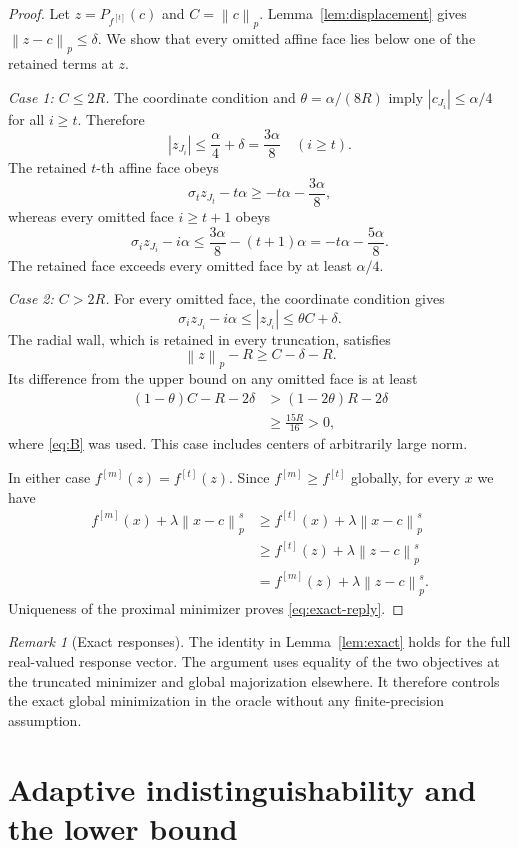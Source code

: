 \documentclass[11pt]{article}
\theoremstyle{definition}
\theoremstyle{remark}
\newtheorem{remark}[theorem]{Remark}
\newcommand{\norm}[1]{\left\lVert#1\right\rVert}
\begin{document}
\begin{proof}
Let $z=P_{f^{[t]}}(c)$ and $C=\norm{c}_p$. Lemma~\ref{lem:displacement}
gives $\norm{z-c}_p\le\delta$. We show that every omitted affine face lies
below one of the retained terms at $z$.

\emph{Case 1: $C\le2R$.}
The coordinate condition and $\theta=\alpha/(8R)$ imply
$|c_{J_i}|\le\alpha/4$ for all $i\ge t$. Therefore
\[
|z_{J_i}|\le\frac{\alpha}{4}+\delta=\frac{3\alpha}{8}
\quad(i\ge t).
\]
The retained $t$-th affine face obeys
\[
\sigma_tz_{J_t}-t\alpha\ge-t\alpha-\frac{3\alpha}{8},
\]
whereas every omitted face $i\ge t+1$ obeys
\[
\sigma_i z_{J_i}-i\alpha
\le\frac{3\alpha}{8}-(t+1)\alpha
=-t\alpha-\frac{5\alpha}{8}.
\]
The retained face exceeds every omitted face by at least $\alpha/4$.

\emph{Case 2: $C>2R$.}
For every omitted face, the coordinate condition gives
\[
\sigma_i z_{J_i}-i\alpha\le|z_{J_i}|\le\theta C+\delta.
\]
The radial wall, which is retained in every truncation, satisfies
\[
\norm{z}_p-R\ge C-\delta-R.
\]
Its difference from the upper bound on any omitted face is at least
\begin{align*}
(1-\theta)C-R-2\delta
&>(1-2\theta)R-2\delta\\
&\ge\frac{15R}{16}>0,
\end{align*}
where \eqref{eq:B} was used. This case includes centers of arbitrarily
large norm.

In either case $f^{[m]}(z)=f^{[t]}(z)$. Since $f^{[m]}\ge f^{[t]}$ globally,
for every $x$ we have
\begin{align*}
f^{[m]}(x)+\lambda\norm{x-c}_p^s
&\ge f^{[t]}(x)+\lambda\norm{x-c}_p^s\\
&\ge f^{[t]}(z)+\lambda\norm{z-c}_p^s\\
&=f^{[m]}(z)+\lambda\norm{z-c}_p^s.
\end{align*}
Uniqueness of the proximal minimizer proves \eqref{eq:exact-reply}.
\end{proof}

\begin{remark}[Exact responses]
The identity in Lemma~\ref{lem:exact} holds for the full real-valued
response vector. The argument uses equality of the two objectives at the
truncated minimizer and global majorization elsewhere. It therefore
controls the exact global minimization in the oracle without any
finite-precision assumption.
\end{remark}

\section{Adaptive indistinguishability and the lower bound}\label{sec:randomization}
\end{document}
